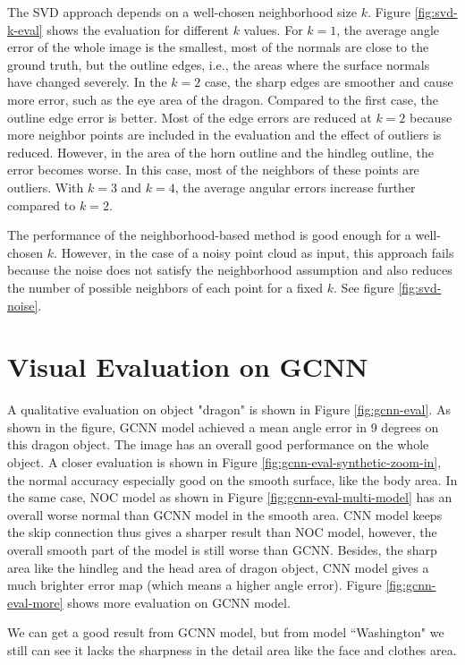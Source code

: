 The SVD approach depends on a well-chosen neighborhood size $ k $. Figure \ref{fig:svd-k-eval} shows the evaluation for different $ k $ values. For $ k=1 $, the average angle error of the whole image is the smallest, most of the normals are close to the ground truth, but the outline edges, i.e., the areas where the surface normals have changed severely. In the $ k=2 $ case, the sharp edges are smoother and cause more error, such as the eye area of the dragon. Compared to the first case, the outline edge error is better. Most of the edge errors are reduced at $ k=2 $ because more neighbor points are included in the evaluation and the effect of outliers is reduced. However, in the area of the horn outline and the hindleg outline, the error becomes worse. In this case, most of the neighbors of these points are outliers.  With $ k=3 $ and $ k=4 $, the average angular errors increase further compared to $ k=2 $.

The performance of the neighborhood-based method is good enough for a well-chosen $ k $. However, in the case of a noisy point cloud as input, this approach fails because the noise does not satisfy the neighborhood assumption and also reduces the number of possible neighbors of each point for a fixed $ k $. See figure \ref{fig:svd-noise}.



\section{Visual Evaluation on GCNN}
A qualitative evaluation on object "dragon" is shown in Figure \ref{fig:gcnn-eval}. As shown in the figure, GCNN model achieved a mean angle error in 9 degrees on this dragon object. The image has an overall good performance on the whole object. A closer evaluation is shown in Figure \ref{fig:gcnn-eval-synthetic-zoom-in}, the normal accuracy especially good on the smooth surface, like the body area. In the same case, NOC model as shown in Figure \ref{fig:gcnn-eval-multi-model} has an overall worse normal than GCNN model in the smooth area. CNN model keeps the skip connection thus gives a sharper result than NOC model, however, the overall smooth part of the model is still worse than GCNN. Besides, the sharp area like the hindleg and the head area of dragon object, CNN model gives a much brighter error map (which means a higher angle error). Figure \ref{fig:gcnn-eval-more} shows more evaluation on GCNN model.

We can get a good result from GCNN model, but from model ``Washington" we still can see it lacks the sharpness in the detail area like the face and clothes area. 



